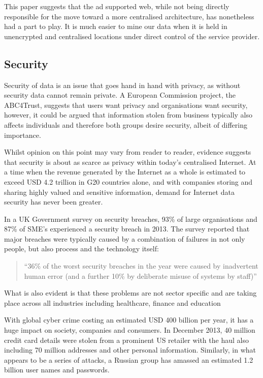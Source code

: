 \documentclass[twocolumn,english]{article}
\begin{document}
This paper suggests that the ad supported web, while not being directly
responsible for the move toward a more centralised architecture, has
nonetheless had a part to play. It is much easier to mine our data
when it is held in unencrypted and centralised locations under direct control of the service provider.

 

\subsection{Security}

Security of data is an issue that goes hand in hand with privacy,
as without security data cannot remain private. A European Commission
project, the ABC4Trust, suggests that users want privacy and organisations
want security, however, it could be argued that information stolen
from business typically also affects individuals and therefore both
groups desire security, albeit of differing importance\cite{euABC4Trust}.

Whilst opinion on this point may vary from reader to reader, evidence
suggests that security is about as scarce as privacy within today\textquoteright s
centralised Internet. At a time when the revenue generated by the
Internet as a whole is estimated to exceed USD 4.2 trillion in G20 countries
alone, and with companies storing and sharing highly valued and sensitive
information, demand for Internet data security has never been greater\cite{bcg12}. %

In a UK Government survey on security breaches, 93\% of large organisations
and 87\% of SME\textquoteright s experienced a security breach in
2013. The survey reported that major breaches were typically caused
by a combination of failures in not only people, but also process
and the technology itself\cite{ukgov13}:
\begin{quote}
\textquotedblleft 36\% of the worst security breaches in the year
were caused by inadvertent human error (and a further 10\% by deliberate
misuse of systems by staff)\textquotedblright{} 
\end{quote}
What is also evident is that these problems are not sector specific
and are taking place across all industries including healthcare, finance
and education\cite{symantec14}

With global cyber crime costing an estimated USD 400 billion per year,
it has a huge impact on society, companies and consumers\cite{mcafee14}. In December 2013, 40 million credit card details were stolen from
a prominent US retailer with the haul also including 70 million addresses
and other personal information. Similarly, in what appears to be a
series of attacks, a Russian group has amassed an estimated 1.2 billion
user names and passwords\cite{nyt14}.
\end{document}
